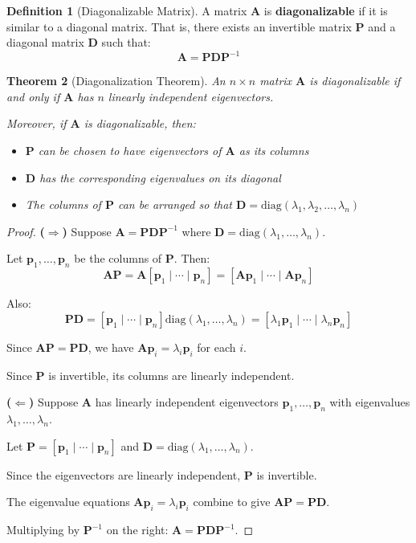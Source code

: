 \documentclass[12pt]{article}
\numberwithin{equation}{section}
\newcommand{\vect}[1]{\boldsymbol{#1}}   %
\newcommand{\mat}[1]{\mathbf{#1}}        %
\theoremstyle{plain}
\newtheorem{theorem}{Theorem}[section]
\theoremstyle{definition}
\newtheorem{definition}[theorem]{Definition}
\theoremstyle{remark}
\begin{document}
\begin{definition}[Diagonalizable Matrix]
A matrix $\mat{A}$ is \textbf{diagonalizable} if it is similar to a diagonal matrix. That is, there exists an invertible matrix $\mat{P}$ and a diagonal matrix $\mat{D}$ such that:
$$\mat{A} = \mat{P}\mat{D}\mat{P}^{-1}$$
\end{definition}

\begin{theorem}[Diagonalization Theorem]
An $n \times n$ matrix $\mat{A}$ is diagonalizable if and only if $\mat{A}$ has $n$ linearly independent eigenvectors.

Moreover, if $\mat{A}$ is diagonalizable, then:
\begin{itemize}
\item $\mat{P}$ can be chosen to have eigenvectors of $\mat{A}$ as its columns
\item $\mat{D}$ has the corresponding eigenvalues on its diagonal
\item The columns of $\mat{P}$ can be arranged so that $\mat{D} = \text{diag}(\lambda_1, \lambda_2, \ldots, \lambda_n)$
\end{itemize}
\end{theorem}

\begin{proof}
\textbf{($\Rightarrow$)} Suppose $\mat{A} = \mat{P}\mat{D}\mat{P}^{-1}$ where $\mat{D} = \text{diag}(\lambda_1, \ldots, \lambda_n)$.

Let $\vect{p}_1, \ldots, \vect{p}_n$ be the columns of $\mat{P}$. Then:
$$\mat{A}\mat{P} = \mat{A}[\vect{p}_1 \mid \cdots \mid \vect{p}_n] = [\mat{A}\vect{p}_1 \mid \cdots \mid \mat{A}\vect{p}_n]$$

Also:
$$\mat{P}\mat{D} = [\vect{p}_1 \mid \cdots \mid \vect{p}_n]\text{diag}(\lambda_1, \ldots, \lambda_n) = [\lambda_1\vect{p}_1 \mid \cdots \mid \lambda_n\vect{p}_n]$$

Since $\mat{A}\mat{P} = \mat{P}\mat{D}$, we have $\mat{A}\vect{p}_i = \lambda_i\vect{p}_i$ for each $i$.

Since $\mat{P}$ is invertible, its columns are linearly independent.

\textbf{($\Leftarrow$)} Suppose $\mat{A}$ has linearly independent eigenvectors $\vect{p}_1, \ldots, \vect{p}_n$ with eigenvalues $\lambda_1, \ldots, \lambda_n$.

Let $\mat{P} = [\vect{p}_1 \mid \cdots \mid \vect{p}_n]$ and $\mat{D} = \text{diag}(\lambda_1, \ldots, \lambda_n)$.

Since the eigenvectors are linearly independent, $\mat{P}$ is invertible.

The eigenvalue equations $\mat{A}\vect{p}_i = \lambda_i\vect{p}_i$ combine to give $\mat{A}\mat{P} = \mat{P}\mat{D}$.

Multiplying by $\mat{P}^{-1}$ on the right: $\mat{A} = \mat{P}\mat{D}\mat{P}^{-1}$.
\end{proof}
\end{document}
